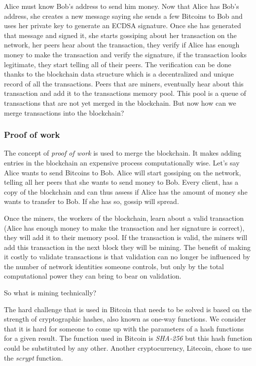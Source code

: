 \documentclass{vldb}
\begin{document}
Alice must know Bob's address to send him money. Now that Alice has Bob's address, she creates a new message saying she sends a few Bitcoins to Bob and uses her private key to generate an ECDSA signature. Once she has generated that message and signed it, she starts gossiping about her transaction on the network, her peers hear about the transaction, they verify if Alice has enough money to make the transaction and verify the signature, if the transaction looks legitimate, they start telling all of their peers. The verification can be done thanks to the blockchain data structure which is a decentralized and unique record of all the transactions. Peers that are miners, eventually hear about this transaction and add it to the transactions memory pool. This pool is a queue of transactions that are not yet merged in the blockchain. But now how can we merge transactions into the blockchain? 

\subsubsection{Proof of work}

The concept of \emph{proof of work} is used to merge the blockchain. It makes adding entries in the blockchain an expensive process computationally wise. Let's say Alice wants to send Bitcoins to Bob. Alice will start gossiping on the network, telling all her peers that she wants to send money to Bob. Every client, has a copy of the blockchain and can thus assess if Alice has the amount of money she wants to transfer to Bob. If she has so, gossip will spread.

Once the miners, the workers of the blockchain, learn about a  valid transaction (Alice has enough money to make the transaction and her signature is correct), they will add it to their memory pool. If the transaction is valid, the miners will add this transaction in the next block they will be mining. The benefit of making it costly to validate transactions is that validation can no longer be influenced by the number of network identities someone controls, but only by the total computational power they can bring to bear on validation.

So what is mining technically?

The hard challenge that is used in Bitcoin that needs to be solved is based on the strength of cryptographic hashes, also known as one-way functions. We consider that it is hard for someone to come up with the parameters of a hash functions for a given result. The function used in Bitcoin is \emph{SHA-256} but this hash function could be substituted by any other. Another cryptocurrency, Litecoin, chose to use the \emph{scrypt} function.
\end{document}
